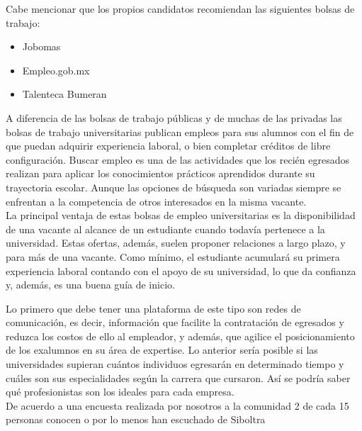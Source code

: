 Cabe mencionar que los propios candidatos recomiendan las siguientes bolsas de trabajo:
\begin{itemize}
    \item Jobomas
    \item Empleo.gob.mx 
    \item Talenteca Bumeran
\end{itemize}

A diferencia de las bolsas de trabajo públicas y de muchas de las privadas las bolsas de trabajo universitarias publican empleos 
para sus alumnos con el fin de que puedan adquirir experiencia laboral, o bien completar créditos de libre configuración.
Buscar empleo es una de las actividades que los recién egresados realizan para aplicar los conocimientos prácticos aprendidos 
durante su trayectoria escolar. Aunque las opciones de búsqueda son variadas siempre se enfrentan a la competencia de otros 
interesados en la misma vacante. \cite{UniJob}\\
\newline
La principal ventaja de estas bolsas de empleo universitarias es la disponibilidad de una vacante al alcance de un estudiante cuando todavía 
pertenece a la universidad. Estas ofertas, además, suelen proponer relaciones a largo plazo, y para más de una vacante. 
Como mínimo, el estudiante acumulará su primera experiencia laboral contando con el apoyo de su universidad, lo que da confianza y, 
además, es una buena guía de inicio.

Lo primero que debe tener una plataforma de este tipo son redes de comunicación, es decir, información que facilite la contratación 
de egresados y reduzca los costos de ello al empleador, y además, que agilice el posicionamiento de los exalumnos en su área 
de expertise. Lo anterior sería posible si las universidades supieran cuántos individuos egresarán en determinado tiempo y 
cuáles son sus especialidades según la carrera que cursaron. Así se podría saber qué profesionistas son los ideales para cada 
empresa.\cite{Economista}\\
\newline
De acuerdo a una encuesta realizada por nosotros a la comunidad 2 de cada 15 personas conocen o por lo menos han escuchado de Siboltra\\
\newline


